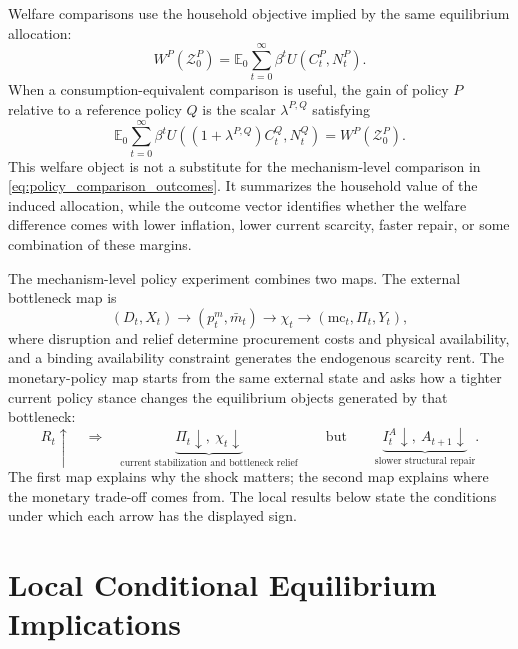 ﻿\documentclass[12pt]{article}
\theoremstyle{remark}
\newcommand{\E}{\mathbb E}
\newcommand{\mc}{\mathrm{mc}}
\begin{document}
Welfare comparisons use the household objective implied by the same equilibrium allocation:
\begin{equation}
    W^P(\mathcal Z_0^P)
    =
    \E_0
    \sum_{t=0}^{\infty}
    \beta^t
    U(C_t^P,N_t^P).
    \label{eq:policy_welfare}
\end{equation}
When a consumption-equivalent comparison is useful, the gain of policy $P$ relative to a reference
policy $Q$ is the scalar $\lambda^{P,Q}$ satisfying
\begin{equation}
    \E_0
    \sum_{t=0}^{\infty}
    \beta^t
    U\!\left((1+\lambda^{P,Q})C_t^Q,N_t^Q\right)
    =
    W^P(\mathcal Z_0^P).
    \label{eq:consumption_equivalent}
\end{equation}
This welfare object is not a substitute for the mechanism-level comparison in
\eqref{eq:policy_comparison_outcomes}. It summarizes the household value of the induced allocation,
while the outcome vector identifies whether the welfare difference comes with lower inflation,
lower current scarcity, faster repair, or some combination of these margins.

The mechanism-level policy experiment combines two maps. The external bottleneck map is
\[
    (D_t,X_t)
    \longrightarrow
    (p_t^m,\bar m_t)
    \longrightarrow
    \chi_t
    \longrightarrow
    (\mc_t,\Pi_t,Y_t),
\]
where disruption and relief determine procurement costs and physical availability, and a binding
availability constraint generates the endogenous scarcity rent. The monetary-policy map starts
from the same external state and asks how a tighter current policy stance changes the equilibrium
objects generated by that bottleneck:
\[
    R_t\uparrow
    \quad\Longrightarrow\quad
    \underbrace{\Pi_t\downarrow,\ \chi_t\downarrow}_{\text{current stabilization and bottleneck relief}}
    \qquad\text{but}\qquad
    \underbrace{I_t^A\downarrow,\ A_{t+1}\downarrow}_{\text{slower structural repair}}.
\]
The first map explains why the shock matters; the second map explains where the monetary trade-off
comes from. The local results below state the conditions under which each arrow has the displayed
sign.

\section{Local Conditional Equilibrium Implications}
\end{document}
